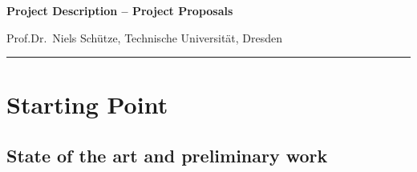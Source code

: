 \documentclass{scrartcl}
\newcommand{\applicants}{Prof.Dr.\ Niels Sch\"utze, Technische Universität, Dresden}
\newcommand{\project}{[GDIE--Global Deficit Irrigation Experiment]}
\begin{document}
\pagestyle{empty}
\setcounter{page}{1}

%

\cleardoublepage
\pagestyle{plain}


{\raggedright{} \normalsize \bfseries 
	Project Description -- Project Proposals \par
	\applicants{} \par
	\project{} \par
	\rule{\textwidth}{0.5pt} \par
}

\section{Starting Point}
\label{sec:work-report}

\subsection*{State of the art and preliminary work}
\end{document}
